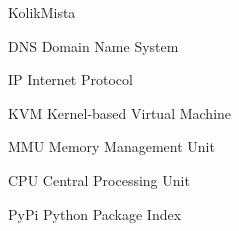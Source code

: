 \begin{seznamzkratek}{KolikMista}

		{DNS}
		{Domain Name System}
		
		{IP}
		{Internet Protocol}
		
		{KVM}
		{Kernel-based Virtual Machine}
		
		{MMU}
		{Memory Management Unit}
		
		{CPU}
		{Central Processing Unit}
		
		{PyPi}
		{Python Package Index}

\end{seznamzkratek}

